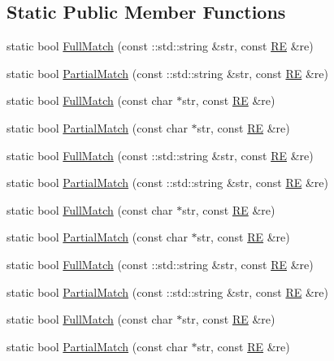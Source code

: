 \subsection*{Static Public Member Functions}
\begin{DoxyCompactItemize}
\item 
static bool \mbox{\hyperlink{classtesting_1_1internal_1_1_r_e_aa79a950758d0f1d62f7762d1e9cefe86}{Full\+Match}} (const \+::std\+::string \&str, const \mbox{\hyperlink{classtesting_1_1internal_1_1_r_e}{RE}} \&re)
\item 
static bool \mbox{\hyperlink{classtesting_1_1internal_1_1_r_e_a1e81f9a87211bdca645e025f8f0236c8}{Partial\+Match}} (const \+::std\+::string \&str, const \mbox{\hyperlink{classtesting_1_1internal_1_1_r_e}{RE}} \&re)
\item 
static bool \mbox{\hyperlink{classtesting_1_1internal_1_1_r_e_a2b13ec1f6ccd6c32f7efa01e21588f0b}{Full\+Match}} (const char $\ast$str, const \mbox{\hyperlink{classtesting_1_1internal_1_1_r_e}{RE}} \&re)
\item 
static bool \mbox{\hyperlink{classtesting_1_1internal_1_1_r_e_a97495dd4c2bb9589522823f060c8e8ba}{Partial\+Match}} (const char $\ast$str, const \mbox{\hyperlink{classtesting_1_1internal_1_1_r_e}{RE}} \&re)
\item 
static bool \mbox{\hyperlink{classtesting_1_1internal_1_1_r_e_aa79a950758d0f1d62f7762d1e9cefe86}{Full\+Match}} (const \+::std\+::string \&str, const \mbox{\hyperlink{classtesting_1_1internal_1_1_r_e}{RE}} \&re)
\item 
static bool \mbox{\hyperlink{classtesting_1_1internal_1_1_r_e_a1e81f9a87211bdca645e025f8f0236c8}{Partial\+Match}} (const \+::std\+::string \&str, const \mbox{\hyperlink{classtesting_1_1internal_1_1_r_e}{RE}} \&re)
\item 
static bool \mbox{\hyperlink{classtesting_1_1internal_1_1_r_e_a2b13ec1f6ccd6c32f7efa01e21588f0b}{Full\+Match}} (const char $\ast$str, const \mbox{\hyperlink{classtesting_1_1internal_1_1_r_e}{RE}} \&re)
\item 
static bool \mbox{\hyperlink{classtesting_1_1internal_1_1_r_e_a97495dd4c2bb9589522823f060c8e8ba}{Partial\+Match}} (const char $\ast$str, const \mbox{\hyperlink{classtesting_1_1internal_1_1_r_e}{RE}} \&re)
\item 
static bool \mbox{\hyperlink{classtesting_1_1internal_1_1_r_e_aa79a950758d0f1d62f7762d1e9cefe86}{Full\+Match}} (const \+::std\+::string \&str, const \mbox{\hyperlink{classtesting_1_1internal_1_1_r_e}{RE}} \&re)
\item 
static bool \mbox{\hyperlink{classtesting_1_1internal_1_1_r_e_a1e81f9a87211bdca645e025f8f0236c8}{Partial\+Match}} (const \+::std\+::string \&str, const \mbox{\hyperlink{classtesting_1_1internal_1_1_r_e}{RE}} \&re)
\item 
static bool \mbox{\hyperlink{classtesting_1_1internal_1_1_r_e_a2b13ec1f6ccd6c32f7efa01e21588f0b}{Full\+Match}} (const char $\ast$str, const \mbox{\hyperlink{classtesting_1_1internal_1_1_r_e}{RE}} \&re)
\item 
static bool \mbox{\hyperlink{classtesting_1_1internal_1_1_r_e_a97495dd4c2bb9589522823f060c8e8ba}{Partial\+Match}} (const char $\ast$str, const \mbox{\hyperlink{classtesting_1_1internal_1_1_r_e}{RE}} \&re)
\end{DoxyCompactItemize}
